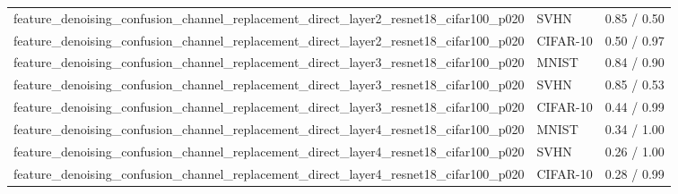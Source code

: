 \begin{tabular}{lll}
feature\_denoising\_confusion\_channel\_replacement\_direct\_layer2\_resnet18\_cifar100\_p020 & SVHN & 0.85 / 0.50 \\
feature\_denoising\_confusion\_channel\_replacement\_direct\_layer2\_resnet18\_cifar100\_p020 & CIFAR-10 & 0.50 / 0.97 \\
feature\_denoising\_confusion\_channel\_replacement\_direct\_layer3\_resnet18\_cifar100\_p020 & MNIST & 0.84 / 0.90 \\
feature\_denoising\_confusion\_channel\_replacement\_direct\_layer3\_resnet18\_cifar100\_p020 & SVHN & 0.85 / 0.53 \\
feature\_denoising\_confusion\_channel\_replacement\_direct\_layer3\_resnet18\_cifar100\_p020 & CIFAR-10 & 0.44 / 0.99 \\
feature\_denoising\_confusion\_channel\_replacement\_direct\_layer4\_resnet18\_cifar100\_p020 & MNIST & 0.34 / 1.00 \\
feature\_denoising\_confusion\_channel\_replacement\_direct\_layer4\_resnet18\_cifar100\_p020 & SVHN & 0.26 / 1.00 \\
feature\_denoising\_confusion\_channel\_replacement\_direct\_layer4\_resnet18\_cifar100\_p020 & CIFAR-10 & 0.28 / 0.99 \\
\bottomrule
\end{tabular}
